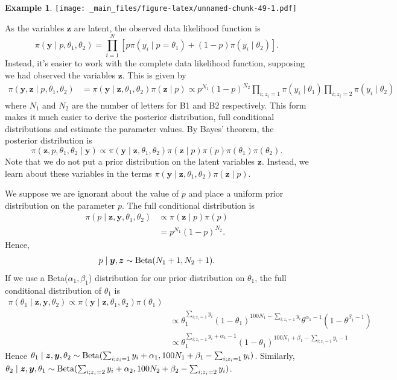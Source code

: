 \documentclass[
]{book}
\theoremstyle{definition}
\theoremstyle{definition}
\newtheorem{example}{Example}[chapter]
\theoremstyle{definition}
\theoremstyle{definition}
\theoremstyle{remark}
\begin{document}
\begin{example}
\texttt{[image: \_main\_files/figure-latex/unnamed-chunk-49-1.pdf]}

As the variables \(\boldsymbol{z}\) are latent, the observed data likelihood function is
\[
\pi(\boldsymbol{y} \mid  p, \theta_1, \theta_2) =\prod_{i=1}^N \left[ p\pi(y_i \mid p = \theta_1) + (1-p)\pi(y_i \mid \theta_2)\right].
\]
Instead, it's easier to work with the complete data likelihood function, supposing we had observed the variables \(\boldsymbol{z}\). This is given by
\begin{align*}
\pi(\boldsymbol{y}, \boldsymbol{z} \mid  p, \theta_1, \theta_2) &= \pi(\boldsymbol{y} \mid  \boldsymbol{z}, \theta_1, \theta_2)\pi(\boldsymbol{z} \mid p)
\propto p^{N_1}(1-p)^{N_2} \prod_{i; z_i = 1}\pi(y_i \mid \theta_1)\prod_{i; z_i = 2}\pi(y_i \mid \theta_2)
\end{align*}
where \(N_1\) and \(N_2\) are the number of letters for B1 and B2 respectively. This form makes it much easier to derive the posterior distribution, full conditional distributions and estimate the parameter values. By Bayes' theorem, the posterior distribution is
\[
\pi(\boldsymbol{z}, p, \theta_1, \theta_2 \mid \boldsymbol{y}) \propto \pi(\boldsymbol{y} \mid  \boldsymbol{z}, \theta_1, \theta_2)\pi(\boldsymbol{z} \mid p)\pi(p)\pi(\theta_1)\pi(\theta_2). 
\]
Note that we do not put a prior distribution on the latent variables \(\boldsymbol{z}\). Instead, we learn about these variables in the terms \(\pi(\boldsymbol{y} \mid \boldsymbol{z}, \theta_1, \theta_2)\pi(\boldsymbol{z} \mid p)\).

We suppose we are ignorant about the value of \(p\) and place a uniform prior distribution on the parameter \(p\). The full conditional distribution is
\begin{align*}
\pi(p\mid \boldsymbol{z}, \boldsymbol{y}, \theta_1, \theta_2) &\propto \pi(\boldsymbol{z} \mid p)\pi(p)\\
& = p^{N_1}(1-p)^{N_2}.
\end{align*}
Hence,
\[
p \mid \boldsymbol{y}, \boldsymbol{z} \sim \hbox{Beta}(N_1 + 1, N_2 + 1).
\]
If we use a Beta(\(\alpha_1, \beta_1\)) distribution for our prior distribution on \(\theta_1\), the full conditional distribution of \(\theta_1\) is
\begin{align*}
\pi(\theta_1 \mid \boldsymbol{z}, \boldsymbol{y}, \theta_2) \propto \pi(\boldsymbol{y} \mid  \boldsymbol{z}, \theta_1, \theta_2)\pi(\theta_1) \\
&\propto \theta_1^{\sum_{i; z_i = 1}y_i}(1-\theta_1)^{100N_1 - \sum_{i; z_i = 1}y_i}\theta^{\alpha_1 - 1}(1-\theta^{\beta_1 - 1}) \\
& \propto \theta_1^{\sum_{i; z_i = 1}y_i + \alpha_1 -1 }(1-\theta_1)^{100N_1 + \beta_1 - \sum_{i; z_i = 1}y_i - 1}
\end{align*}
Hence \(\theta_1 \mid \boldsymbol{z}, \boldsymbol{y}, \theta_2 \sim \hbox{Beta}(\sum_{i; z_i = 1}y_i + \alpha_1 , 100N_1 + \beta_1 - \sum_{i; z_i = 1}y_i)\). Similarly, \(\theta_2 \mid \boldsymbol{z}, \boldsymbol{y}, \theta_1 \sim \hbox{Beta}(\sum_{i; z_i = 2}y_i + \alpha_2 , 100N_2 + \beta_2 - \sum_{i; z_i = 2}y_i)\).


\end{example}
\end{document}
